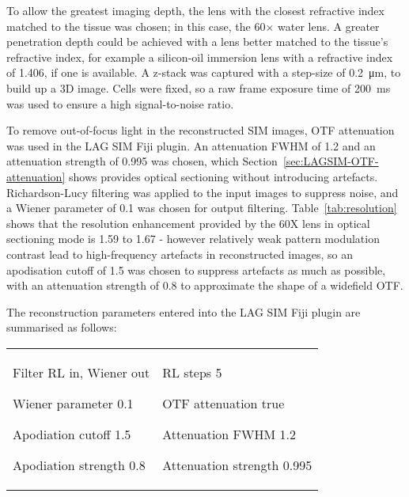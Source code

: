 To allow the greatest imaging depth, the lens with the closest refractive index matched to the tissue was chosen; in this case, the 60$\times$ water lens. 
A greater penetration depth could be achieved with a lens better matched to the tissue's refractive index, for example a silicon-oil immersion lens with a refractive index of \num{1.406}, if one is available. 
A z-stack was captured with a step-size of \SI{0.2}{\micro\metre}, to build up a 3D image. 
Cells were fixed, so a raw frame exposure time of \SI{200}{\milli\second} was used to ensure a high signal-to-noise ratio. 

To remove out-of-focus light in the reconstructed SIM images, OTF attenuation was used in the LAG SIM Fiji plugin. 
An attenuation FWHM of 1.2 and an attenuation strength of 0.995 was chosen, which Section~\ref{sec:LAGSIM-OTF-attenuation} shows provides optical sectioning without introducing artefacts. 
Richardson-Lucy filtering was applied to the input images to suppress noise, and a Wiener parameter of 0.1 was chosen for output filtering. 
Table~\ref{tab:resolution} shows that the resolution enhancement provided by the 60X lens in optical sectioning mode is 1.59 to 1.67 - however relatively weak pattern modulation contrast lead to high-frequency artefacts in reconstructed images, so an apodisation cutoff of 1.5 was chosen to suppress artefacts as much as possible, with an attenuation strength of 0.8 to approximate the shape of a widefield OTF. 

The reconstruction parameters entered into the LAG SIM Fiji plugin are summarised as follows:\newline
\begin{tabular}{p{}p{}}
\begin{labelling}[margin={Attenuation strength}]
	\item[Filter] RL in, Wiener out
	\item[Wiener parameter] 0.1
	\item[Apodiation cutoff] 1.5
	\item[Apodiation strength] 0.8
\end{labelling} &
\begin{labelling}[margin={Attenuation strength}]
	\item[RL steps] 5
	\item[OTF attenuation] true
	\item[Attenuation FWHM] 1.2
	\item[Attenuation strength] 0.995 
\end{labelling}
\end{tabular}

